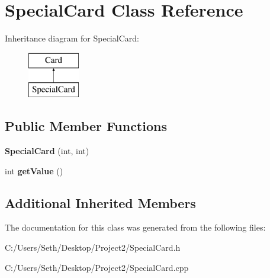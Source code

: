\hypertarget{class_special_card}{}\section{Special\+Card Class Reference}
\label{class_special_card}
Inheritance diagram for Special\+Card\+:\begin{figure}[H]
\begin{center}
\leavevmode
\includegraphics[height=2.000000cm]{class_special_card}
\end{center}
\end{figure}
\subsection*{Public Member Functions}
\begin{DoxyCompactItemize}
\item 
\mbox{\label{class_special_card_a5f02d11446f822747fef386e53036dd8}} 
{\bfseries Special\+Card} (int, int)
\item 
\mbox{\label{class_special_card_ac29202fc09bf1c5b62c23869ce0a32ad}} 
int {\bfseries get\+Value} ()
\end{DoxyCompactItemize}
\subsection*{Additional Inherited Members}


The documentation for this class was generated from the following files\+:\begin{DoxyCompactItemize}
\item 
C\+:/\+Users/\+Seth/\+Desktop/\+Project2/Special\+Card.\+h\item 
C\+:/\+Users/\+Seth/\+Desktop/\+Project2/Special\+Card.\+cpp\end{DoxyCompactItemize}
